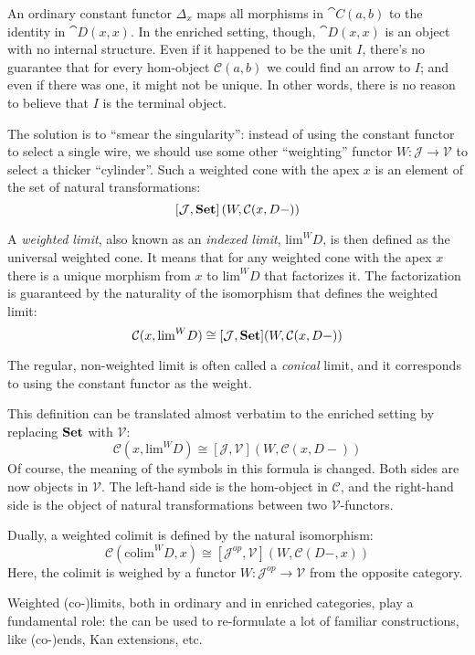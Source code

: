 \documentclass[DaoFP]{subfiles}
\begin{document}
An ordinary constant functor $\Delta_x$ maps all morphisms in $\cat C(a, b)$ to the identity in $\cat D(x, x)$. In the enriched setting, though, $\cat D(x, x)$ is an object with no internal structure. Even if it happened to be the unit $I$, there's no guarantee that for every hom-object $\mathcal C(a, b)$ we could find an arrow to $I$; and even if there was one, it might not be unique. In other words, there is no reason to believe that $I$ is the terminal object.

The solution is to ``smear the singularity'': instead of using the constant functor to select a single wire, we should use some other ``weighting'' functor $W \colon \mathcal J\to \mathcal V$ to select a thicker ``cylinder''. Such a weighted cone with the apex $x$ is an element of the set of natural transformations:
\[ [\mathcal J, \mathbf{Set}] \left(W, \mathcal C(x, D-)\right) \]

A \emph{weighted limit}, also known as an \emph{indexed limit}, $\text{lim}^W D$, is then defined as the universal weighted cone. It means that for any weighted cone with the apex $x$ there is a unique morphism from $x$ to $\text{lim}^W D$ that factorizes it. The factorization is guaranteed by the naturality of the isomorphism that defines the weighted limit:
\[  \mathcal C(x, \text{lim}^W D) \cong [\mathcal J, \mathbf{Set}] (W, \mathcal C(x, D-)) \]

The regular, non-weighted limit is often called a \emph{conical} limit, and it corresponds to using the constant functor as the weight. 

This definition can be translated almost verbatim to the enriched setting by replacing $\mathbf{Set}$ with $\mathcal V$:
\[  \mathcal C(x, \text{lim}^W D) \cong [\mathcal J, \mathcal V] (W, \mathcal C(x, D-)) \]
Of course, the meaning of the symbols in this formula is changed. Both sides are now objects in $\mathcal V$. The left-hand side is the hom-object in $\mathcal C$, and the right-hand side is the object of natural transformations between two $\mathcal V$-functors.

Dually, a weighted colimit is defined by the natural isomorphism:
\[  \mathcal C(\text{colim}^W D, x) \cong [\mathcal J^{op}, \mathcal V] (W, \mathcal C(D-, x)) \]
Here, the colimit is weighed by a functor $W \colon \mathcal J^{op} \to \mathcal V$ from the opposite category.

Weighted (co-)limits, both in ordinary and in enriched categories, play a fundamental role: the can be used to re-formulate a lot of familiar constructions, like (co-)ends, Kan extensions, etc. 
\end{document}
